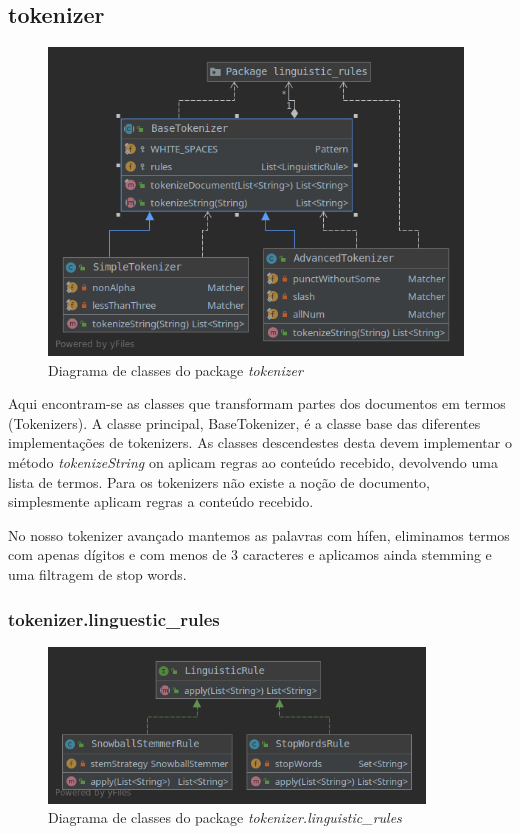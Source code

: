 \documentclass[12pt]{article}
\begin{document}
\subsection{tokenizer}
\begin{figure}[h]
  \center
  \includegraphics[width=11cm]{packages_tokenizer.png}
  \caption{Diagrama de classes do package \it tokenizer}
\end{figure}

Aqui encontram-se as classes que transformam partes dos documentos em termos (Tokenizers). 
A classe principal, BaseTokenizer, é a classe base das diferentes implementações
de tokenizers. As classes descendestes desta devem implementar o método {\it tokenizeString}
on aplicam regras ao conteúdo recebido, devolvendo uma lista de termos.
Para os tokenizers não existe a noção de documento, simplesmente aplicam regras a
conteúdo recebido.

No nosso tokenizer avançado mantemos as palavras com hífen, eliminamos termos
com apenas dígitos e com menos de 3 caracteres e aplicamos ainda stemming e uma
filtragem de stop words.

\subsubsection{tokenizer.linguestic\_rules}
\begin{figure}[h]
  \center
  \includegraphics[width=10cm]{packages_tokenizer_linguistic_rules.png}
  \caption{Diagrama de classes do package \it tokenizer.linguistic\_rules}
\end{figure}
\end{document}
